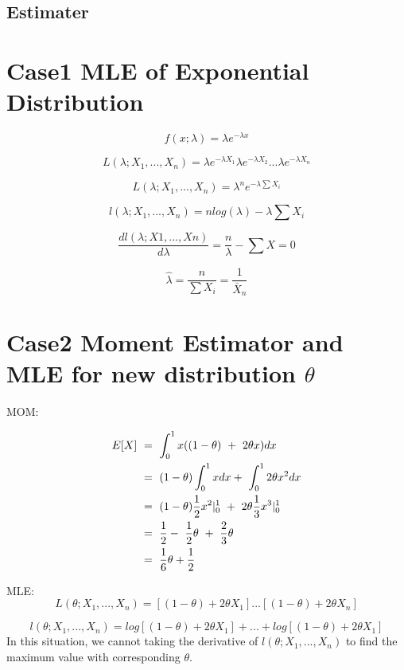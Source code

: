 \documentclass[]{article}
\begin{document}
\subsection{Estimater}\label{estimater}

\section{Case1 MLE of Exponential
Distribution}\label{case1-mle-of-exponential-distribution}

\[f(x;\lambda)=\lambda e^{-\lambda x}\]

\[L(\lambda;X_1,...,X_n)=\lambda e^{-\lambda X_1}\lambda e^{-\lambda X_2}...\lambda e^{-\lambda X_n}\]

\[L(\lambda;X_1,...,X_n)=\lambda^ne^{-\lambda\sum X_i}\]

\[l(\lambda;X_1,...,X_n)=nlog(\lambda)-\lambda \sum X_i\]

\[\frac{dl(\lambda;X1,...,Xn)}{d\lambda}=\frac{n}{\lambda}-\sum X=0\]

\[\hat\lambda=\frac{n}{\sum X_i}=\frac{1}{\bar X_n}\]

\section{\texorpdfstring{Case2 Moment Estimator and MLE for new
distribution
\(\theta\)}{Case2 Moment Estimator and MLE for new distribution \textbackslash{}theta}}\label{case2-moment-estimator-and-mle-for-new-distribution-theta}

MOM:

\begin{align}
E[X]\ & =\ \int^1_0 x((1-\theta)\ +\ 2\theta x)dx \notag \\ 
& =\ (1-\theta)\int^1_0 xdx +\ \int^1_0 2\theta x^2 dx \notag \\ 
& =\ (1-\theta)\frac{1}{2}x^2\arrowvert^1_0\ +\ 2\theta \frac{1}{3}x^3\arrowvert^1_0\ \notag \\ 
& =\ \frac{1}{2} -\ \frac{1}{2}\theta\ +\ \frac{2}{3}\theta \notag \\
& =\ \frac{1}{6}\theta+\frac{1}{2} \notag
\end{align}

MLE:
\[L(\theta;X_1,...,X_n)=[(1-\theta)+2\theta X_1]...[(1-\theta)+2\theta X_n]\]

\[l(\theta;X_1,...,X_n)=log[(1-\theta)+2\theta X_1]+...+log[(1-\theta)+2\theta X_1]\]
In this situation, we cannot taking the derivative of
\(l(\theta;X_1,...,X_n)\) to find the maximum value with corresponding
\(\theta\).
\end{document}
